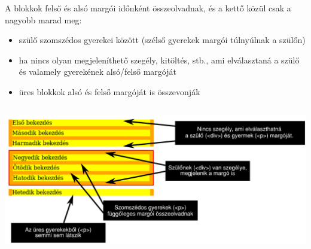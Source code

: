 \begin{frame}
  A blokkok felső és alsó margói időnként összeolvadnak, és a kettő közül csak a nagyobb marad meg:
  \begin{itemize}
    \item szülő szomszédos gyerekei között (szélső gyerekek 
    margói túlnyúlnak a szülőn)
    \item ha nincs olyan megjeleníthető szegély, kitöltés, stb., 
    ami elválasztaná a szülő és valamely gyerekének alsó/felső margóját
    \item üres blokkok alsó és felső margóját is összevonják
  \end{itemize}
  \vfill
\end{frame}

\begin{frame}
  \begin{columns}[T]
      \begin{exampleblock}{}
        \scriptsize
        
      \end{exampleblock}
      \begin{exampleblock}{\vspace*{-3ex}}
        \scriptsize
        
      \end{exampleblock}
  \end{columns} 
\end{frame}

\begin{frame}
  \begin{center}
    \includegraphics[scale=0.55]{margok.pdf}
  \end{center}
\end{frame}
